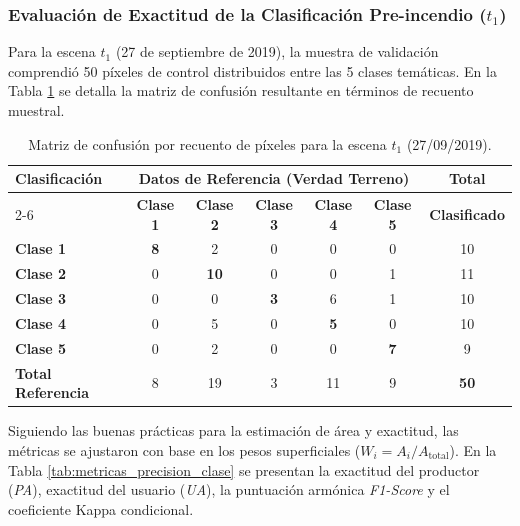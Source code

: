\documentclass[12pt]{article}
\begin{document}
\subsubsection{Evaluación de Exactitud de la Clasificación Pre-incendio ($t_1$)}

Para la escena $t_1$ (27 de septiembre de 2019), la muestra de validación comprendió 50 píxeles de control distribuidos entre las 5 clases temáticas. En la Tabla \ref{tab:matriz_confusion_conteo} se detalla la matriz de confusión resultante en términos de recuento muestral.

\begin{table}[H]
    \centering
    \caption{Matriz de confusión por recuento de píxeles para la escena $t_1$ (27/09/2019).}
    \label{tab:matriz_confusion_conteo}
    \small
    \begin{tabular}{@{}lcccccc@{}}
        \toprule
        \textbf{Clasificación} & \multicolumn{5}{c}{\textbf{Datos de Referencia (Verdad Terreno)}} & \textbf{Total} \\
        \cmidrule(lr){2-6}
        & \textbf{Clase 1} & \textbf{Clase 2} & \textbf{Clase 3} & \textbf{Clase 4} & \textbf{Clase 5} & \textbf{Clasificado} \\
        \midrule
        \textbf{Clase 1} & \textbf{8} & 2 & 0 & 0 & 0 & 10 \\
        \textbf{Clase 2} & 0 & \textbf{10} & 0 & 0 & 1 & 11 \\
        \textbf{Clase 3} & 0 & 0 & \textbf{3} & 6 & 1 & 10 \\
        \textbf{Clase 4} & 0 & 5 & 0 & \textbf{5} & 0 & 10 \\
        \textbf{Clase 5} & 0 & 2 & 0 & 0 & \textbf{7} & 9 \\
        \midrule
        \textbf{Total Referencia} & 8 & 19 & 3 & 11 & 9 & \textbf{50} \\
        \bottomrule
    \end{tabular}
\end{table}

Siguiendo las buenas prácticas para la estimación de área y exactitud, las métricas se ajustaron con base en los pesos superficiales ($W_i = A_i / A_{\text{total}}$). En la Tabla \ref{tab:metricas_precision_clase} se presentan la exactitud del productor (\textit{PA}), exactitud del usuario (\textit{UA}), la puntuación armónica \textit{F1-Score} y el coeficiente Kappa condicional.
\end{document}
